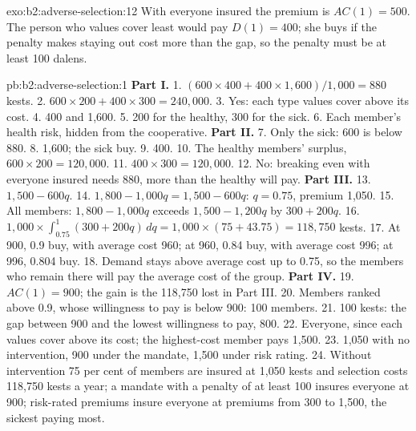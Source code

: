 \begin{solution}{exo:b2:adverse-selection:12}
With everyone insured the premium is $\mathit{AC}(1) = 500$. The person who values cover least would pay $D(1) = 400$; she buys if the penalty makes
staying out cost more than the gap, so the penalty must be at least 100 dalens.
\end{solution}

\begin{solution}{pb:b2:adverse-selection:1}
\textbf{Part I.}
1. $(600 \times 400 + 400 \times 1{,}600)/1{,}000 = 880$ kests.
2. $600 \times 200 + 400 \times 300 = 240{,}000$.
3. Yes: each type values cover above its cost.
4. 400 and 1{,}600.
5. 200 for the healthy, 300 for the sick.
6. Each member's health risk, hidden from the cooperative.
\textbf{Part II.}
7. Only the sick: 600 is below 880.
8. 1{,}600; the sick buy.
9. 400.
10. The healthy members' surplus, $600 \times 200 = 120{,}000$.
11. $400 \times 300 = 120{,}000$.
12. No: breaking even with everyone insured needs 880, more than the healthy will pay.
\textbf{Part III.}
13. $1{,}500 - 600q$.
14. $1{,}800 - 1{,}000q = 1{,}500 - 600q$: $q = 0.75$, premium 1{,}050.
15. All members: $1{,}800 - 1{,}000q$ exceeds $1{,}500 - 1{,}200q$ by $300 + 200q$.
16. $1{,}000 \times \int_{0.75}^1 (300 + 200q)\,dq = 1{,}000 \times (75 + 43.75) = 118{,}750$ kests.
17. At 900, 0.9 buy, with average cost 960; at 960, 0.84 buy, with average cost 996; at 996, 0.804 buy.
18. Demand stays above average cost up to 0.75, so the members who remain there will pay the average cost of the group.
\textbf{Part IV.}
19. $\mathit{AC}(1) = 900$; the gain is the 118{,}750 lost in Part III.
20. Members ranked above 0.9, whose willingness to pay is below 900: 100 members.
21. 100 kests: the gap between 900 and the lowest willingness to pay, 800.
22. Everyone, since each values cover above its cost; the highest-cost member pays 1{,}500.
23. 1{,}050 with no intervention, 900 under the mandate, 1{,}500 under risk rating.
24. Without intervention 75 per cent of members are insured at 1{,}050 kests and selection costs 118{,}750 kests a year; a mandate with a
penalty of at least 100 insures everyone at 900; risk-rated premiums insure everyone at premiums from 300 to 1{,}500, the sickest
paying most.
\end{solution}
